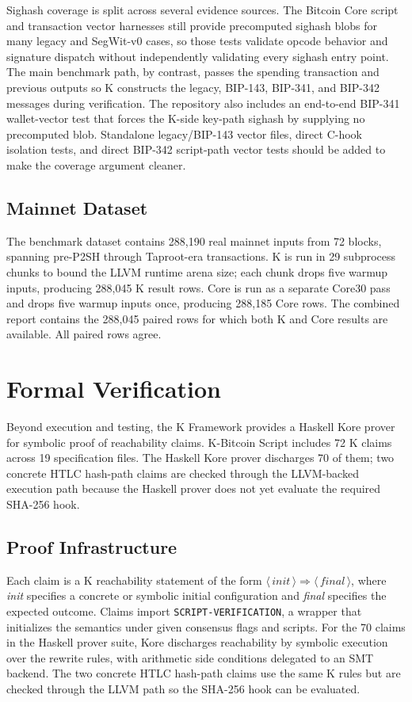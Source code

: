 \documentclass[conference]{IEEEtran}
\newcommand{\kframework}{K Framework\xspace}
\begin{document}
Sighash coverage is split across several evidence sources.  The Bitcoin Core
script and transaction vector harnesses still provide precomputed sighash blobs
for many legacy and SegWit-v0 cases, so those tests validate opcode behavior
and signature dispatch without independently validating every sighash entry
point.  The main benchmark path, by contrast, passes the spending transaction
and previous outputs so K constructs the legacy, BIP-143, BIP-341, and BIP-342
messages during verification.  The repository also includes an end-to-end
BIP-341 wallet-vector test that forces the K-side key-path sighash by supplying
no precomputed blob.  Standalone legacy/BIP-143 vector files, direct C-hook
isolation tests, and direct BIP-342 script-path vector tests should be added to
make the coverage argument cleaner.

\subsection{Mainnet Dataset}

The benchmark dataset contains 288,190 real mainnet inputs from 72 blocks,
spanning pre-P2SH through Taproot-era transactions.  K is run in 29 subprocess
chunks to bound the LLVM runtime arena size; each chunk drops five warmup
inputs, producing 288,045 K result rows.  Core is run as a separate Core30 pass
and drops five warmup inputs once, producing 288,185 Core rows.  The combined
report contains the 288,045 paired rows for which both K and Core results are
available.  All paired rows agree.

\section{Formal Verification}

Beyond execution and testing, the \kframework provides a Haskell Kore prover
for symbolic proof of reachability claims.  K-Bitcoin Script includes 72 K
claims across 19 specification files.  The Haskell Kore prover discharges 70 of
them; two concrete HTLC hash-path claims are checked through the LLVM-backed
execution path because the Haskell prover does not yet evaluate the required
SHA-256 hook.

\subsection{Proof Infrastructure}

Each claim is a K reachability statement of the form $\langle\,\textit{init}\,\rangle
\Rightarrow \langle\,\textit{final}\,\rangle$, where \textit{init} specifies
a concrete or symbolic initial configuration and \textit{final} specifies the
expected outcome.  Claims import \texttt{SCRIPT-VERIFICATION}, a wrapper that
initializes the semantics under given consensus flags and scripts.  For the 70
claims in the Haskell prover suite, Kore discharges reachability by symbolic
execution over the rewrite rules, with arithmetic side conditions delegated to
an SMT backend.  The two concrete HTLC hash-path claims use the same K rules but
are checked through the LLVM path so the SHA-256 hook can be evaluated.
\end{document}
